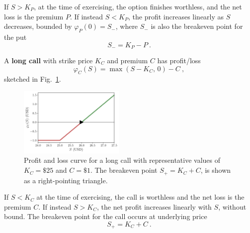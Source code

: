 \documentclass[aps,reprint]{revtex4-2}
\begin{document}
If $S > K_P$, at the time of exercising, the option finishes worthless,  and the net loss is the premium $P$. If instead $S<K_P$, the profit increases linearly as $S$ decreases, bounded by $\varphi_P(0) = S_-$, where 
$S_-$ is also the breakeven point for the put
\begin{equation}
S_- = K_P - P~.
\end{equation}


A \textbf{long call} with strike price $K_C$ and premium $C$ has profit/loss 
\begin{equation}
\varphi_C(S) = \max(S - K_C,\,0) - C~,
\end{equation}
sketched in Fig.~\ref{fig:call}.
\begin{figure}[hb]
    \centering
    \includegraphics[width=0.45\textwidth]{figs/call.pdf}
    \caption{Profit and loss curve for a long call with representative values of $K_C = \$25$ and $C = \$1$.  The breakeven point $S_+ = K_C + C$, is shown as a right-pointing triangle.
    }
    \label{fig:call}
\end{figure}

If $S < K_C$ at the time of exercising, the call is worthless and the net loss is the premium $C$. If instead $S>K_C$, the net profit increases
linearly with $S$, without bound. The breakeven point for the call occurs at underlying price
\begin{equation}
S_+ = K_C + C~.
\end{equation}
\end{document}
